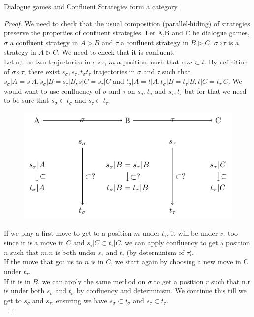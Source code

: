 \documentclass[a4paper,UKenglish]{lipics}
\begin{document}
\begin{theorem}
 Dialogue games and Confluent Strategies form a category.
\end{theorem}
\begin{proof}
We need to check that the usual composition (parallel-hiding) of strategies preserve the properties of confluent strategies.
Let A,B and C be  dialogue games, $\sigma$ a confluent strategy in $A\triangleright B$ and $\tau$ a confluent strategy in $B\triangleright C$. $\sigma \circ \tau$ is a strategy in $A \triangleright C$. We need to check that it is confluent.\\

Let s,t be two trajectories in $\sigma \circ \tau$, $m$ a position, such that $s.m \subset t$. By definition of $\sigma \circ \tau$, there exist $s_\sigma, s_\tau, t_\sigma t_\tau$ trajectories in $\sigma$ and $\tau$ such that $s_\sigma|A=s|A, s_\sigma|B=s_\tau|B, s|C=s_\tau|C$ and $t_\sigma|A=t|A, t_\sigma|B=t_\tau|B, t|C=t_\tau|C$.
We would want to use confluency of $\sigma$ and $\tau$ on $s_\sigma, t_\sigma$ and $s_\tau, t_\tau$ but for that we need to be sure that $s_\sigma \subset t_\sigma$ and $s_\tau \subset t_\tau$.
\begin{figure}[H]\centering\includegraphics[scale=0.8]{confluency_and_composition_1.pdf}\caption{} \end{figure}

If we play a first move to get to a position $m$ under $t_\tau$, it will be under $s_\tau$ too since it is a move in $C$ and $s_\tau|C \subset t_\tau|C$. we can apply confluency to get a position $n$ such that $m.n$ is both under $s_\tau$ and $t_\tau$ (by determinism of $\tau$).\\ If the move that got us to $n$ is in $C$, we start again by choosing a new move in C under $t_\tau$.\\ If it is in $B$, we can apply the same method on $\sigma$ to get a position $r$ such that n.r is under both $s_\sigma$ and $t_\sigma$ by confluency and determinism. We continue this till we get to $s_\sigma$ and $s_\tau$, ensuring we have  $s_\sigma \subset t_\sigma$ and $s_\tau \subset t_\tau$.\\



\end{proof}
\end{document}
